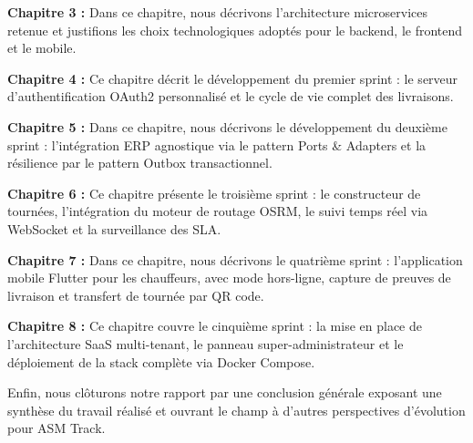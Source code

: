 \textbf{Chapitre 3 :} Dans ce chapitre, nous décrivons l'architecture microservices retenue
et justifions les choix technologiques adoptés pour le backend, le frontend et le mobile.

\textbf{Chapitre 4 :} Ce chapitre décrit le développement du premier sprint : le serveur
d'authentification OAuth2 personnalisé et le cycle de vie complet des livraisons.

\textbf{Chapitre 5 :} Dans ce chapitre, nous décrivons le développement du deuxième sprint :
l'intégration ERP agnostique via le pattern Ports \& Adapters et la résilience par le
pattern Outbox transactionnel.

\textbf{Chapitre 6 :} Ce chapitre présente le troisième sprint : le constructeur de tournées,
l'intégration du moteur de routage OSRM, le suivi temps réel via WebSocket et la
surveillance des SLA.

\textbf{Chapitre 7 :} Dans ce chapitre, nous décrivons le quatrième sprint : l'application
mobile Flutter pour les chauffeurs, avec mode hors-ligne, capture de preuves de livraison
et transfert de tournée par QR code.

\textbf{Chapitre 8 :} Ce chapitre couvre le cinquième sprint : la mise en place de
l'architecture SaaS multi-tenant, le panneau super-administrateur et le déploiement
de la stack complète via Docker Compose.

Enfin, nous clôturons notre rapport par une conclusion générale exposant une synthèse du
travail réalisé et ouvrant le champ à d'autres perspectives d'évolution pour ASM Track.
